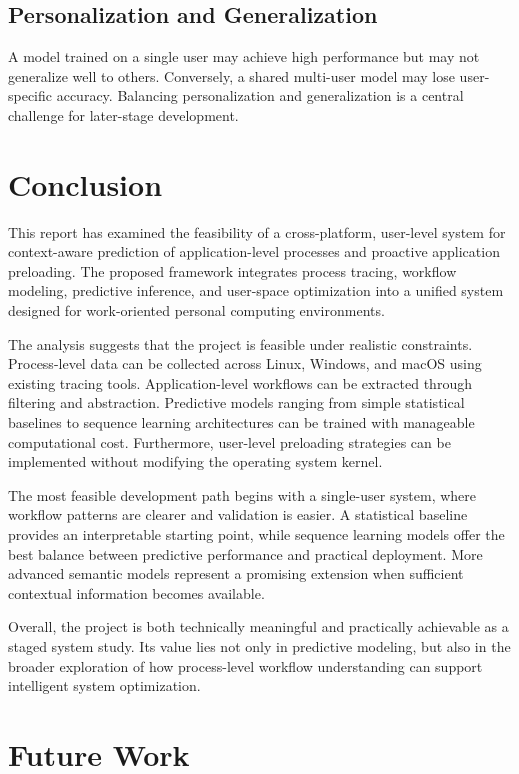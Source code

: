 \documentclass[11pt]{article}
\begin{document}
\subsection{Personalization and Generalization}

A model trained on a single user may achieve high performance but may not generalize well to others. Conversely, a shared multi-user model may lose user-specific accuracy. Balancing personalization and generalization is a central challenge for later-stage development.

\section{Conclusion}

This report has examined the feasibility of a cross-platform, user-level system for context-aware prediction of application-level processes and proactive application preloading. The proposed framework integrates process tracing, workflow modeling, predictive inference, and user-space optimization into a unified system designed for work-oriented personal computing environments.

The analysis suggests that the project is feasible under realistic constraints. Process-level data can be collected across Linux, Windows, and macOS using existing tracing tools. Application-level workflows can be extracted through filtering and abstraction. Predictive models ranging from simple statistical baselines to sequence learning architectures can be trained with manageable computational cost. Furthermore, user-level preloading strategies can be implemented without modifying the operating system kernel.

The most feasible development path begins with a single-user system, where workflow patterns are clearer and validation is easier. A statistical baseline provides an interpretable starting point, while sequence learning models offer the best balance between predictive performance and practical deployment. More advanced semantic models represent a promising extension when sufficient contextual information becomes available.

Overall, the project is both technically meaningful and practically achievable as a staged system study. Its value lies not only in predictive modeling, but also in the broader exploration of how process-level workflow understanding can support intelligent system optimization.

\section{Future Work}
\end{document}
